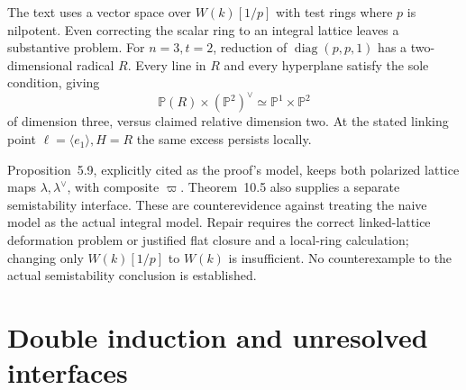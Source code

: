\documentclass[10pt]{article}
\begin{document}
The text uses a vector space over \(W(k)[1/p]\) with test rings where \(p\) is nilpotent. Even correcting the scalar ring to an integral lattice leaves a substantive problem. For \(n=3,t=2\), reduction of \(\operatorname{diag}(p,p,1)\) has a two-dimensional radical \(R\). Every line in \(R\) and every hyperplane satisfy the sole condition, giving \[\mathbb P(R)\times(\mathbb P^2)^\vee
 \simeq\mathbb P^1\times\mathbb P^2\] of dimension three, versus claimed relative dimension two. At the stated linking point \(\ell=\langle e_1\rangle,H=R\) the same excess persists locally.\par
Proposition 5.9, explicitly cited as the proof’s model, keeps both polarized lattice maps \(\lambda,\lambda^\vee\), with composite \(\varpi\). Theorem 10.5 also supplies a separate semistability interface. These are counterevidence against treating the naive model as the actual integral model. Repair requires the correct linked-lattice deformation problem or justified flat closure and a local-ring calculation; changing only \(W(k)[1/p]\) to \(W(k)\) is insufficient. No counterexample to the actual semistability conclusion is established.\par
\section*{Double induction and unresolved interfaces}
\end{document}
